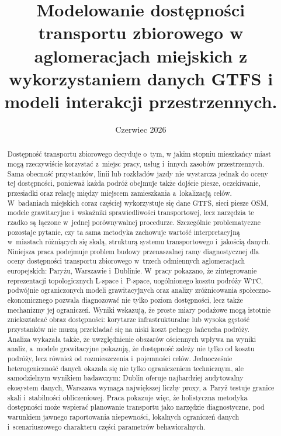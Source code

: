 \documentclass{pracamgr}
\title{Modelowanie dostępności transportu zbiorowego w aglomeracjach miejskich z wykorzystaniem danych GTFS i modeli interakcji przestrzennych.}
\date{Czerwiec 2026}
\begin{document}
\maketitle

\begin{abstract}
\noindent Dostępność transportu zbiorowego decyduje o~tym, w jakim stopniu mieszkańcy miast mogą rzeczywiście korzystać z~miejsc pracy, usług i~innych zasobów przestrzennych. Sama obecność przystanków, linii lub rozkładów jazdy nie wystarcza jednak do oceny tej dostępności, ponieważ każda podróż obejmuje także dojście piesze, oczekiwanie, przesiadki oraz relację między miejscem zamieszkania a~lokalizacją celów. W~badaniach miejskich coraz częściej wykorzystuje się dane GTFS, sieci piesze OSM, modele grawitacyjne i~wskaźniki sprawiedliwości transportowej, lecz narzędzia te rzadko są łączone w~jednej porównywalnej procedurze. Szczególnie problematyczne pozostaje pytanie, czy ta sama metodyka zachowuje wartość interpretacyjną w~miastach różniących się skalą, strukturą systemu transportowego i~jakością danych. Niniejsza praca podejmuje problem budowy przenaszalnej ramy diagnostycznej dla oceny dostępności transportu zbiorowego w~trzech odmiennych aglomeracjach europejskich: Paryżu, Warszawie i~Dublinie. W~pracy pokazano, że zintegrowanie reprezentacji topologicznych \mbox{L-space} i~\mbox{P-space}, uogólnionego kosztu podróży \mbox{WTC}, podwójnie ograniczonych modeli grawitacyjnych oraz analizy zróżnicowania społeczno-ekonomicznego pozwala diagnozować nie tylko poziom dostępności, lecz także mechanizmy jej ograniczeń. Wyniki wskazują, że proste miary podażowe mogą istotnie zniekształcać obraz dostępności: korytarze infrastrukturalne lub wysoka gęstość przystanków nie muszą przekładać się na niski koszt pełnego łańcucha podróży. Analiza wykazała także, że uwzględnienie obszarów ościennych wpływa na wyniki analiz, a~modele grawitacyjne pokazują, że dostępność zależy nie tylko od kosztu podróży, lecz również od rozmieszczenia i~pojemności celów. Jednocześnie heterogeniczność danych okazała się nie tylko ograniczeniem technicznym, ale samodzielnym wynikiem badawczym: Dublin oferuje najbardziej audytowalny ekosystem danych, Warszawa wymaga największej liczby proxy, a~Paryż testuje granice skali i~stabilności obliczeniowej. Praca pokazuje więc, że holistyczna metodyka dostępności może wspierać planowanie transportu jako narzędzie diagnostyczne, pod warunkiem jawnego raportowania niepewności, lokalnych ograniczeń danych i~scenariuszowego charakteru części parametrów behawioralnych.
\newline\newline

\end{abstract}
\end{document}
